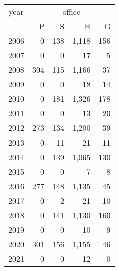 \footnotesize\begin{tabular}[t]{lrrrr}
\toprule
\multicolumn{1}{c}{year} & \multicolumn{4}{c}{office} \\
\cmidrule(l{3pt}r{3pt}){1-1} \cmidrule(l{3pt}r{3pt}){2-5}
  & P & S & H & G\\
\midrule
2006 & 0 & 138 & 1,118 & 156\\
2007 & 0 & 0 & 17 & 5\\
2008 & 304 & 115 & 1,166 & 37\\
2009 & 0 & 0 & 18 & 14\\
2010 & 0 & 181 & 1,326 & 178\\
2011 & 0 & 0 & 13 & 20\\
2012 & 273 & 134 & 1,200 & 39\\
2013 & 0 & 11 & 21 & 11\\
2014 & 0 & 139 & 1,065 & 130\\
2015 & 0 & 0 & 7 & 8\\
2016 & 277 & 148 & 1,135 & 45\\
2017 & 0 & 2 & 21 & 10\\
2018 & 0 & 141 & 1,130 & 160\\
2019 & 0 & 0 & 10 & 9\\
2020 & 301 & 156 & 1,155 & 46\\
2021 & 0 & 0 & 12 & 0\\
\bottomrule
\end{tabular}
